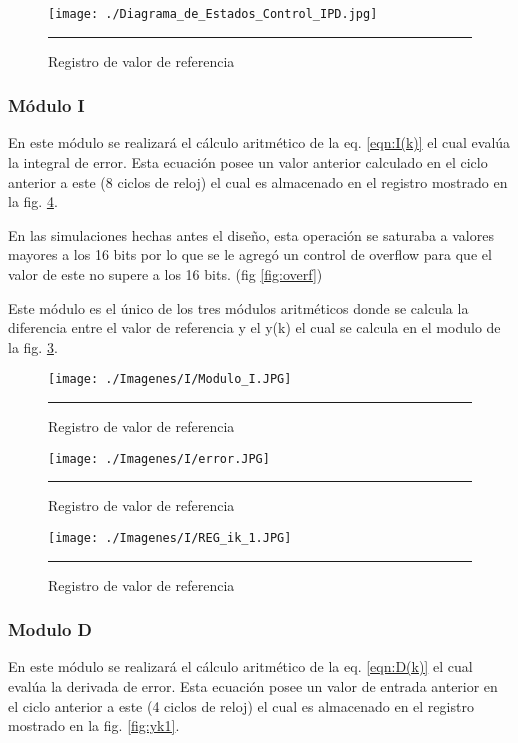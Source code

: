 \documentclass[12pt,a4paper]{article} %
\begin{document}
\begin{figure}[htbp]
  \centering
    \texttt{[image: ./Diagrama\_de\_Estados\_Control\_IPD.jpg]}
    \rule{35em}{0.3pt}
  \caption[estados]{Registro de valor de referencia}
  \label{fig:Estados}
\end{figure}

\subsubsection{Módulo I}

En este módulo se realizará el cálculo aritmético de la eq. \ref{eqn:I(k)} el cual evalúa la integral de error. Esta ecuación posee un valor anterior calculado en el ciclo anterior a este (8 ciclos de reloj) el cual es almacenado en el registro mostrado en la fig. \ref{fig:regI}.

En las simulaciones hechas antes el diseño, esta operación se saturaba a valores mayores a los 16 bits por lo que se le agregó un control de overflow para que el valor de este no supere a los 16 bits. (fig \ref{fig:overf})

Este módulo es el único de los tres módulos aritméticos donde se calcula la diferencia entre el valor de referencia y el y(k) el cual se calcula en el modulo de la fig. \ref{fig:error}.
 
\begin{figure}[htbp]
  \centering
    \texttt{[image: ./Imagenes/I/Modulo\_I.JPG]}
    \rule{35em}{0.3pt}
  \caption[I]{Registro de valor de referencia}
  \label{fig:I}
\end{figure}

\begin{figure}[htbp]
  \centering
    \texttt{[image: ./Imagenes/I/error.JPG]}
    \rule{35em}{0.3pt}
  \caption[error]{Registro de valor de referencia}
  \label{fig:error}
\end{figure}

\begin{figure}[htbp]
  \centering
    \texttt{[image: ./Imagenes/I/REG\_ik\_1.JPG]}
    \rule{35em}{0.3pt}
  \caption[reg_i]{Registro de valor de referencia}
  \label{fig:regI}
\end{figure}

\subsubsection{Modulo D}

En este módulo se realizará el cálculo aritmético de la eq. \ref{eqn:D(k)} el cual evalúa la derivada de error. Esta ecuación posee un valor de entrada anterior en el ciclo anterior a este (4 ciclos de reloj) el cual es almacenado en el registro mostrado en la fig. \ref{fig:yk1}.
\end{document}
